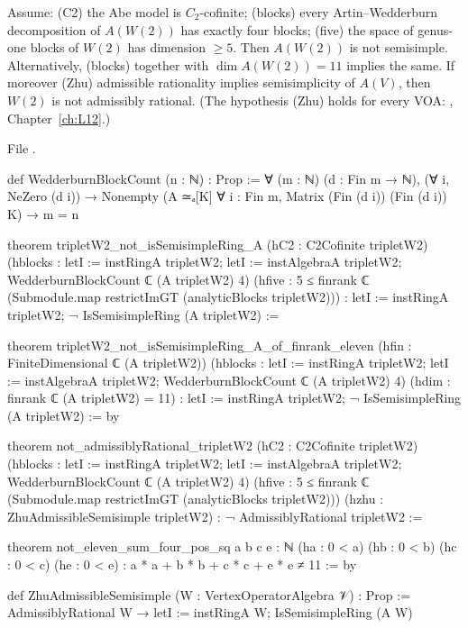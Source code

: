 \begin{theorem}\label{l18:thm:abeirr}
Assume: (C2) the Abe model is $C_2$-cofinite; (blocks) every Artin--Wedderburn decomposition of $A(W(2))$ has
exactly four blocks; (five) the space of genus-one blocks of $W(2)$ has dimension $\ge5$. Then $A(W(2))$ is not
semisimple. Alternatively, (blocks) together with $\dim A(W(2))=11$ implies the same. If moreover
(Zhu) admissible rationality implies semisimplicity of $A(V)$, then $W(2)$ is not admissibly rational. (The
hypothesis (Zhu) holds for every VOA: , Chapter~\ref{ch:L12}.)
\end{theorem}
\noindent File .
\begin{leancode}
def WedderburnBlockCount (n : ℕ) : Prop :=
  ∀ (m : ℕ) (d : Fin m → ℕ), (∀ i, NeZero (d i)) →
    Nonempty (A ≃ₐ[K] ∀ i : Fin m, Matrix (Fin (d i)) (Fin (d i)) K) → m = n

theorem tripletW2_not_isSemisimpleRing_A
    (hC2 : C2Cofinite tripletW2)
    (hblocks : letI := instRingA tripletW2; letI := instAlgebraA tripletW2;
      WedderburnBlockCount ℂ (A tripletW2) 4)
    (hfive : 5 ≤ finrank ℂ (Submodule.map restrictImGT (analyticBlocks tripletW2))) :
    letI := instRingA tripletW2; ¬ IsSemisimpleRing (A tripletW2) :=

theorem tripletW2_not_isSemisimpleRing_A_of_finrank_eleven
    (hfin : FiniteDimensional ℂ (A tripletW2))
    (hblocks : letI := instRingA tripletW2; letI := instAlgebraA tripletW2;
      WedderburnBlockCount ℂ (A tripletW2) 4)
    (hdim : finrank ℂ (A tripletW2) = 11) :
    letI := instRingA tripletW2; ¬ IsSemisimpleRing (A tripletW2) := by

theorem not_admissiblyRational_tripletW2
    (hC2 : C2Cofinite tripletW2)
    (hblocks : letI := instRingA tripletW2; letI := instAlgebraA tripletW2;
      WedderburnBlockCount ℂ (A tripletW2) 4)
    (hfive : 5 ≤ finrank ℂ (Submodule.map restrictImGT (analyticBlocks tripletW2)))
    (hzhu : ZhuAdmissibleSemisimple tripletW2) :
    ¬ AdmissiblyRational tripletW2 :=

theorem not_eleven_sum_four_pos_sq {a b c e : ℕ} (ha : 0 < a) (hb : 0 < b) (hc : 0 < c)
    (he : 0 < e) : a * a + b * b + c * c + e * e ≠ 11 := by
\end{leancode}
\begin{leancode}
def ZhuAdmissibleSemisimple (W : VertexOperatorAlgebra 𝒱) : Prop :=
  AdmissiblyRational W → letI := instRingA W; IsSemisimpleRing (A W)
\end{leancode}

